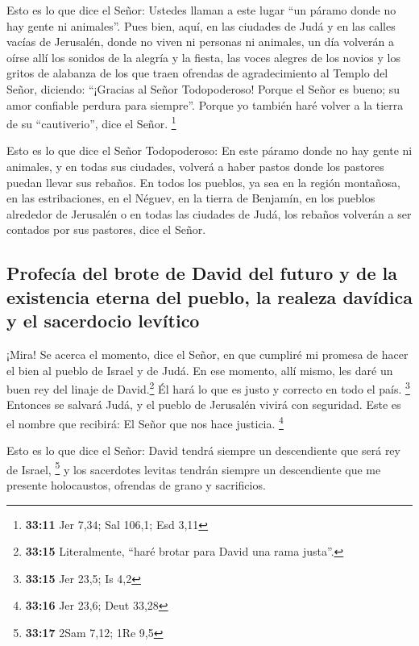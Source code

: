  Esto es lo que dice el Señor: Ustedes llaman a este
lugar ``un páramo donde no hay gente ni animales''. Pues bien, aquí, en
las ciudades de Judá y en las calles vacías de Jerusalén, donde no viven
ni personas ni animales, un día  volverán a oírse allí
los sonidos de la alegría y la fiesta, las voces alegres de los novios y
los gritos de alabanza de los que traen ofrendas de agradecimiento al
Templo del Señor, diciendo: ``¡Gracias al Señor Todopoderoso! Porque el
Señor es bueno; su amor confiable perdura para siempre''. Porque yo
también haré volver a la tierra de su ``cautiverio'', dice el Señor.
\footnote{\textbf{33:11} Jer 7,34; Sal 106,1; Esd 3,11}

 Esto es lo que dice el Señor Todopoderoso: En este
páramo donde no hay gente ni animales, y en todas sus ciudades, volverá
a haber pastos donde los pastores puedan llevar sus rebaños.
 En todos los pueblos, ya sea en la región montañosa, en
las estribaciones, en el Néguev, en la tierra de Benjamín, en los
pueblos alrededor de Jerusalén o en todas las ciudades de Judá, los
rebaños volverán a ser contados por sus pastores, dice el Señor.

\hypertarget{profecuxeda-del-brote-de-david-del-futuro-y-de-la-existencia-eterna-del-pueblo-la-realeza-davuxeddica-y-el-sacerdocio-levuxedtico}{%
\subsection{Profecía del brote de David del futuro y de la existencia
eterna del pueblo, la realeza davídica y el sacerdocio
levítico}\label{profecuxeda-del-brote-de-david-del-futuro-y-de-la-existencia-eterna-del-pueblo-la-realeza-davuxeddica-y-el-sacerdocio-levuxedtico}}

 ¡Mira! Se acerca el momento, dice el Señor, en que
cumpliré mi promesa de hacer el bien al pueblo de Israel y de Judá.
 En ese momento, allí mismo, les daré un buen rey del
linaje de David.\footnote{\textbf{33:15} Literalmente, ``haré brotar
  para David una rama justa''.} Él hará lo que es justo y correcto en
todo el país. \footnote{\textbf{33:15} Jer 23,5; Is 4,2} 
Entonces se salvará Judá, y el pueblo de Jerusalén vivirá con seguridad.
Este es el nombre que recibirá: El Señor que nos hace justicia.
\footnote{\textbf{33:16} Jer 23,6; Deut 33,28}

 Esto es lo que dice el Señor: David tendrá siempre un
descendiente que será rey de Israel, \footnote{\textbf{33:17} 2Sam 7,12;
  1Re 9,5}  y los sacerdotes levitas tendrán siempre un
descendiente que me presente holocaustos, ofrendas de grano y
sacrificios.

